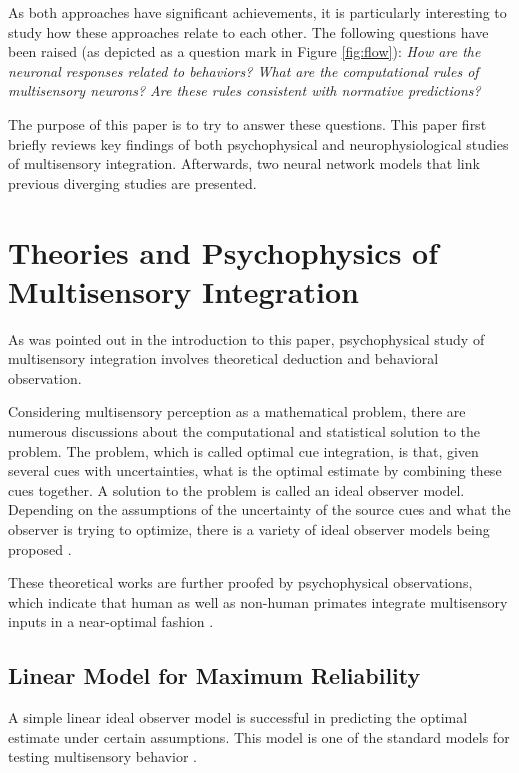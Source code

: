 \documentclass{article}[11pt]
\begin{document}
As both approaches have significant achievements, it is particularly interesting to study how these approaches relate to each other. The following questions have been raised (as depicted as a question mark in Figure \ref{fig:flow}): \emph{How are the neuronal responses related to behaviors? What are the computational rules of multisensory neurons? Are these rules consistent with normative predictions?} 

The purpose of this paper is to try to answer these questions. This paper first briefly reviews key findings of both psychophysical and neurophysiological studies of multisensory integration. Afterwards, two neural network models \cite{ma_bayesian_2006,ohshiro_normalization_2011} that link previous diverging studies are presented.

\section{Theories and Psychophysics of Multisensory Integration}
As was pointed out in the introduction to this paper, psychophysical study of multisensory integration involves theoretical deduction and behavioral observation.

Considering multisensory perception as a mathematical problem, there are numerous discussions about the computational and statistical solution to the problem. The problem, which is called optimal cue integration, is that, given several cues with uncertainties, what is the optimal estimate by combining these cues together. A solution to the problem is called an ideal observer model. Depending on the assumptions of the uncertainty of the source cues and what the observer is trying to optimize, there is a variety of ideal observer models being proposed \cite{landy_ideal-observer_2011}.

These theoretical works are further proofed by psychophysical observations, which indicate that human as well as non-human primates integrate multisensory inputs in a near-optimal fashion \cite{ernst_humans_2002,alais_ventriloquist_2004,gu_neural_2008}.

\subsection{Linear Model for Maximum Reliability}
A simple linear ideal observer model is successful in predicting the optimal estimate under certain assumptions. This model is one of the standard models for testing multisensory behavior \cite{landy_ideal-observer_2011}.
\end{document}
